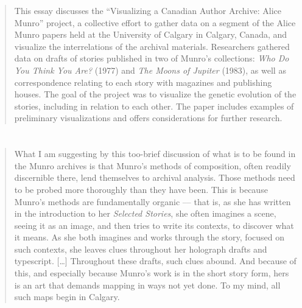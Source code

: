 




\begin{paper}
\renewcommand*{\pagemark}{}

\begin{abstract}
This essay discusses the ``Visualizing a Canadian Author Archive: Alice Munro'' project, a collective effort to gather data on a segment of the Alice Munro papers held at the University of Calgary in Calgary, Canada, and visualize the interrelations of the archival materials. Researchers gathered data on drafts of stories published in two of Munro’s collections: \emph{Who Do You Think You Are?} (1977) and \emph{The Moons of Jupiter} (1983), as well as correspondence relating to each story with magazines and publishing houses. The goal of the project was to visualize the genetic evolution of the stories, including in relation to each other. The paper includes examples of preliminary visualizations and offers considerations for further research.
\end{abstract}


\section*{} 
\begin{quote}
What I am suggesting by this too-brief discussion of what is to be found
in the Munro archives is that Munro's methods of composition, often readily
discernible there, lend themselves to archival analysis. Those methods
need to be probed more thoroughly than they have been. This is because
Munro's methods are fundamentally organic –– that is, as she has written
in the introduction to her \emph{Selected Stories}, she often imagines a
scene, seeing it as an image, and then tries to write its contexts, to
discover what it means. As she both imagines and works through the
story, focused on such contexts, she leaves clues throughout her
holograph drafts and typescript. {[}\ldots{]} Throughout these drafts,
such clues abound. And because of this, and especially because Munro's
work is in the short story form, hers is an art that demands mapping in
ways not yet done. To my mind, all such maps begin in Calgary.


\end{quote}
\end{paper}
